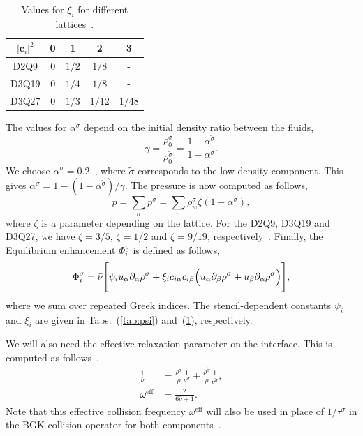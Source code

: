 \documentclass[aps,physrev,twocolumn,10pt]{revtex4-2}
\begin{document}
\begin{table}[htbp]
\centering
\begin{tabular}{| c | c c c c|} 
    \hline
    $|\bm{c}_i|^2$& 0 & 1 & 2 & 3 \\ 
    \hline
    D2Q9 & $0$ & $1/2$ & $1/8$ & -\\
    D3Q19 & $0$ & $1/4$ & $1/8$ & - \\
    D3Q27 & $0$ & $1/3$ & $1/12$ & $1/48$ \\
    \hline
\end{tabular}
\caption{Values for $\xi_i$ for different lattices~\cite{leclaire_generalized_2017}.}\label{tab:xi}
\end{table}

\noindent The values for $\alpha^\sigma$ depend on the initial density ratio between the fluids,
\begin{equation}
    \gamma = \frac{\rho_0^\sigma}{\rho_0^{\tilde{\sigma}}} = \frac{1 - \alpha^{\tilde{\sigma}}}{1 - \alpha^\sigma}.
\end{equation}
We choose $\alpha^{\tilde{\sigma}} = 0.2$~\cite{datadien_directional_2024}, where ${\tilde{\sigma}}$ corresponds to the low-density component. This gives $\alpha^\sigma = 1 - \left(1 - \alpha^{\tilde{\sigma}}\right)/\gamma$. The pressure is now computed as follows,
\begin{equation}
    p = \sum_\sigma p^\sigma = \sum_\sigma \rho^\sigma_w\zeta \left(1 - \alpha^\sigma\right),
\end{equation}
where $\zeta$ is a parameter depending on the lattice. For the D2Q9, D3Q19 and D3Q27, we have $\zeta = 3/5$, $\zeta = 1/2$ and $\zeta = 9/19$, respectively~\cite{leclaire_generalized_2017}. Finally, the Equilibrium enhancement $\Phi_i^\sigma$ is defined as follows,
\begin{equation}
    \Phi_i^\sigma = \bar{\nu}\Biggl[\psi_i u_\alpha \partial_\alpha \rho^\sigma + \xi_i c_{i\alpha}c_{i\beta}\Bigl(u_\alpha \partial_\beta \rho^\sigma + u_\beta \partial_\alpha \rho^\sigma\Bigr)\Biggr],
\end{equation}
where we sum over repeated Greek indices. The stencil-dependent constants $\psi_i$ and $\xi_i$ are given in Tabs.~(\ref{tab:psi}) and~(\ref{tab:xi}), respectively. 

We will also need the effective relaxation parameter on the interface. This is computed as follows~\cite{leclaire_generalized_2017},
\begin{equation}
\begin{split}
    \frac{1}{\bar{\nu}} &= \frac{\rho^\sigma}{\rho}\frac{1}{\nu^\sigma} + \frac{\rho^{\tilde{\sigma}}}{\rho}\frac{1}{\nu^{\tilde{\sigma}}},\\
    \omega^\text{eff} &= \frac{2}{6\bar{\nu} + 1}.
\end{split}
\end{equation}
Note that this effective collision frequency $\omega^\text{eff}$ will also be used in place of $1/\tau^\sigma$ in the BGK collision operator for both components~\cite{coveney_lattice_2002}.
\end{document}
